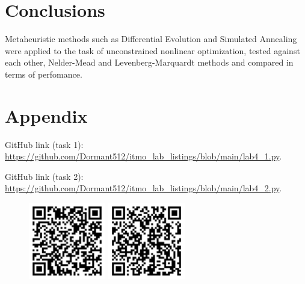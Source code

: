\documentclass[12pt, a4paper]{article}
\begin{document}
\section*{Conclusions}

Metaheuristic methods such as Differential Evolution and Simulated Annealing were applied to the task of unconstrained nonlinear optimization, tested against each other, Nelder-Mead and Levenberg-Marquardt methods and compared in terms of perfomance.

\newpage

\section*{Appendix}

GitHub link (task 1): \url{https://github.com/Dormant512/itmo_lab_listings/blob/main/lab4_1.py}.

GitHub link (task 2): \url{https://github.com/Dormant512/itmo_lab_listings/blob/main/lab4_2.py}.

\begin{figure}[!h]
\centering
\includegraphics[width=0.3\textwidth]{lab4-1.png}
\includegraphics[width=0.3\textwidth]{lab4-2.png}
\end{figure}
\end{document}
